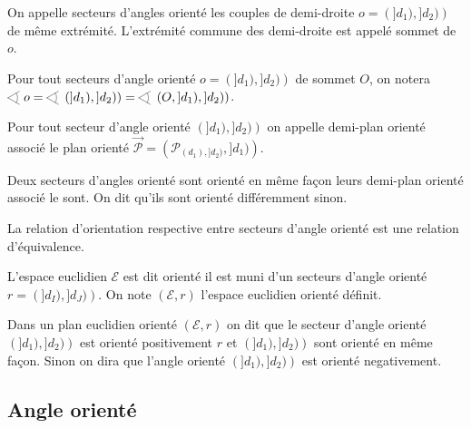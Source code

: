 \begin{defi}
    On appelle secteurs d'angles orienté les couples de demi-droite $o = \left(]d_1),]d_2)\right)$ de même extrémité. L'extrémité commune des demi-droite est appelé sommet de $o$.
\end{defi}
\begin{rema}
    Pour tout secteurs d'angle orienté $o = \left(]d_1),]d_2)\right)$ de sommet $O$, on notera $\anglesaillant o = \anglesaillant \left(]d_1),]d_2)\right)= \anglesaillant\left(O,]d_1),]d_2)\right)$.
\end{rema}
\begin{defi}
    Pour tout secteur d'angle orienté $\left(]d_1),]d_2)\right)$ on appelle demi-plan orienté associé le plan orienté $\overrightarrow{\mathcal{P}}=\left(\mathcal{P}_{(d_1),]d_2)},]d_1)\right)$.
\end{defi}
\begin{defi}
    Deux secteurs d'angles orienté sont orienté en même façon \ssi leurs demi-plan orienté associé le sont. On dit qu'ils sont orienté différemment sinon. 
\end{defi}
\begin{prop}
    La relation d'orientation respective entre secteurs d'angle orienté est une relation d'équivalence.
\end{prop}
\begin{defi}
L'espace euclidien $\mathcal{E}$ est dit orienté \ssi il est muni d'un secteurs d'angle orienté $r = \left(]d_I),]d_J)\right)$. On note $(\mathcal{E},r)$ l'espace euclidien orienté définit.
\end{defi}
\begin{defi}[Orientation]
Dans un plan euclidien orienté $(\mathcal{E},r)$ on dit que le secteur d'angle orienté $\left(]d_1),]d_2)\right)$ est orienté positivement \ssi $r$ et $\left(]d_1),]d_2)\right)$ sont orienté en même façon. Sinon on dira que l'angle orienté $\left(]d_1),]d_2)\right)$ est orienté negativement.
\end{defi}

        \subsection{Angle orienté}

